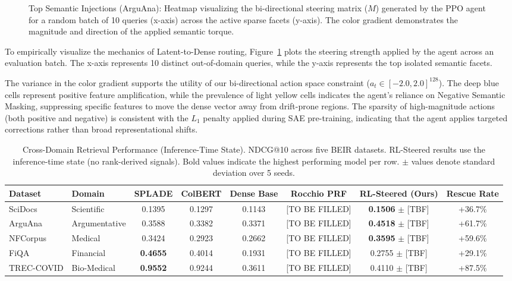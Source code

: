 \documentclass[sigconf]{acmart}
\begin{document}
\begin{figure}[t]
  \centering
  \caption{Top Semantic Injections (ArguAna): Heatmap visualizing the bi-directional steering matrix ($M$) generated by the PPO agent for a random batch of 10 queries (x-axis) across the active sparse facets (y-axis). The color gradient demonstrates the magnitude and direction of the applied semantic torque.}
  \label{fig:heatmap}
\end{figure}

To empirically visualize the mechanics of Latent-to-Dense routing, Figure~\ref{fig:heatmap} plots the steering strength applied by the agent across an evaluation batch. The x-axis represents 10 distinct out-of-domain queries, while the y-axis represents the top isolated semantic facets.

The variance in the color gradient supports the utility of our bi-directional action space constraint ($a_t \in [-2.0, 2.0]^{128}$). The deep blue cells represent positive feature amplification, while the prevalence of light yellow cells indicates the agent's reliance on Negative Semantic Masking, suppressing specific features to move the dense vector away from drift-prone regions. The sparsity of high-magnitude actions (both positive and negative) is consistent with the $L_1$ penalty applied during SAE pre-training, indicating that the agent applies targeted corrections rather than broad representational shifts.

\begin{table}[t]
  \caption{Cross-Domain Retrieval Performance (Inference-Time State). NDCG@10 across five BEIR datasets. RL-Steered results use the inference-time state (no rank-derived signals). Bold values indicate the highest performing model per row. $\pm$ values denote standard deviation over 5 seeds.}
  \label{tab:results}
  \begin{tabular}{llcccccc}
    \toprule
    Dataset & Domain & SPLADE & ColBERT & Dense Base & Rocchio PRF & RL-Steered (Ours) & Rescue Rate\\
    \midrule
    SciDocs & Scientific & 0.1395 & 0.1297 & 0.1143 & [TO BE FILLED] & \textbf{0.1506} $\pm$ [TBF] & +36.7\%\\
    ArguAna & Argumentative & 0.3588 & 0.3382 & 0.3371 & [TO BE FILLED] & \textbf{0.4518} $\pm$ [TBF] & +61.7\%\\
    NFCorpus & Medical & 0.3424 & 0.2923 & 0.2662 & [TO BE FILLED] & \textbf{0.3595} $\pm$ [TBF] & +59.6\%\\
    FiQA & Financial & \textbf{0.4655} & 0.4014 & 0.1931 & [TO BE FILLED] & 0.2755 $\pm$ [TBF] & +29.1\%\\
    TREC-COVID & Bio-Medical & \textbf{0.9552} & 0.9244 & 0.3611 & [TO BE FILLED] & 0.4110 $\pm$ [TBF] & +87.5\%\\
    \bottomrule
  \end{tabular}
\end{table}
\end{document}
